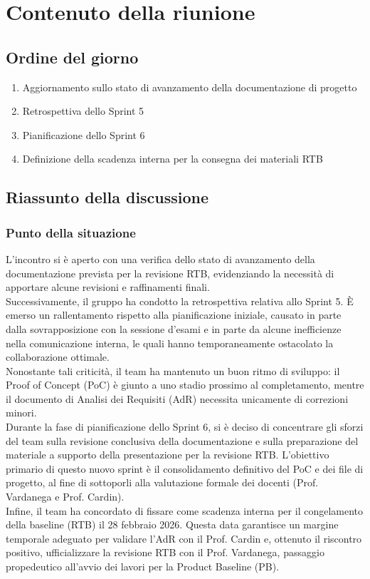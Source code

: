\documentclass[a4paper, 11pt]{article}
\begin{document}
\section{Contenuto della riunione}

\subsection{Ordine del giorno}
\begin{enumerate}
    \item Aggiornamento sullo stato di avanzamento della documentazione di progetto
    \item Retrospettiva dello Sprint 5
    \item Pianificazione dello Sprint 6
    \item Definizione della scadenza interna per la consegna dei materiali RTB
\end{enumerate}

\newpage

\subsection{Riassunto della discussione}
\subsubsection{Punto della situazione}
L'incontro si è aperto con una verifica dello stato di avanzamento della documentazione prevista per la revisione RTB, evidenziando la necessità di apportare alcune revisioni e raffinamenti finali.
\\
Successivamente, il gruppo ha condotto la retrospettiva relativa allo Sprint 5. È emerso un rallentamento rispetto alla pianificazione iniziale, causato in parte dalla sovrapposizione con la sessione d'esami e in parte da alcune inefficienze nella comunicazione interna, le quali hanno temporaneamente ostacolato la collaborazione ottimale.
\\
Nonostante tali criticità, il team ha mantenuto un buon ritmo di sviluppo: il Proof of Concept (PoC) è giunto a uno stadio prossimo al completamento, mentre il documento di Analisi dei Requisiti (AdR) necessita unicamente di correzioni minori.
\\
Durante la fase di pianificazione dello Sprint 6, si è deciso di concentrare gli sforzi del team sulla revisione conclusiva della documentazione e sulla preparazione del materiale a supporto della presentazione per la revisione RTB. L'obiettivo primario di questo nuovo sprint è il consolidamento definitivo del PoC e dei file di progetto, al fine di sottoporli alla valutazione formale dei docenti (Prof. Vardanega e Prof. Cardin).
\\
Infine, il team ha concordato di fissare come scadenza interna per il congelamento della baseline (RTB) il 28 febbraio 2026. Questa data garantisce un margine temporale adeguato per validare l'AdR con il Prof. Cardin e, ottenuto il riscontro positivo, ufficializzare la revisione RTB con il Prof. Vardanega, passaggio propedeutico all'avvio dei lavori per la Product Baseline (PB).
\end{document}
